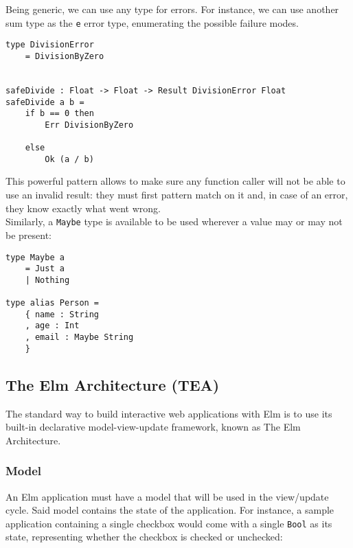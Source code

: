 Being generic, we can use any type for errors. For instance, we can use another sum type as the \texttt{e} error type, enumerating the possible failure modes. 
\begin{verbatim}
type DivisionError
    = DivisionByZero


safeDivide : Float -> Float -> Result DivisionError Float
safeDivide a b =
    if b == 0 then
        Err DivisionByZero

    else
        Ok (a / b)
\end{verbatim}
This powerful pattern allows to make sure any function caller will not be able to use an invalid result: they must first pattern match on it and, in case of an error, they know exactly what went wrong.\\

Similarly, a \texttt{Maybe} type is available to be used wherever a value may or may not be present:
\begin{verbatim}
type Maybe a
    = Just a
    | Nothing

type alias Person =
    { name : String
    , age : Int
    , email : Maybe String
    }
\end{verbatim}

\subsection{The Elm Architecture (TEA)}

The standard way to build interactive web applications with Elm is to use its built-in declarative model-view-update framework, known as The Elm Architecture.

\subsubsection{Model}
An Elm application must have a model that will be used in the view/update cycle. Said model contains the state of the application. For instance, a sample application containing a single checkbox would come with a single \texttt{Bool} as its state, representing whether the checkbox is checked or unchecked:

